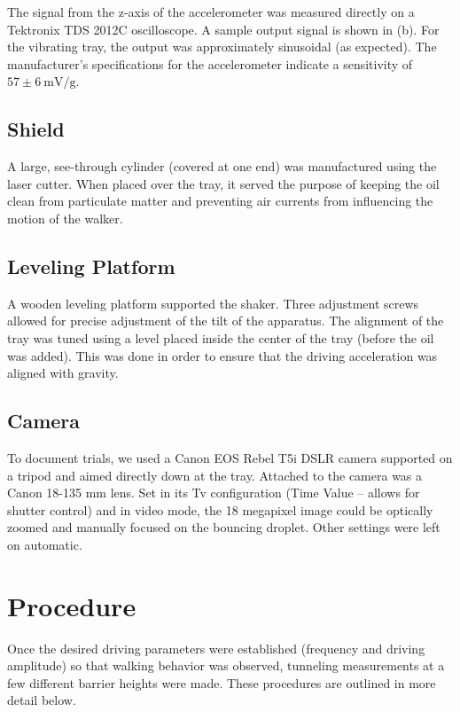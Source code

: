      The signal from the z-axis of the accelerometer was measured directly on a Tektronix TDS 2012C oscilloscope. A sample output signal is shown in (b). For the vibrating tray, the output was approximately sinusoidal (as expected). The manufacturer's specifications for the accelerometer indicate a sensitivity of $57 \pm 6~\mathrm{mV/g}$. 
    
\subsection{Shield}
    A large, see-through cylinder (covered at one end) was manufactured using the laser cutter. When placed over the tray, it served the purpose of keeping the oil clean from particulate matter and preventing air currents from influencing the motion of the walker.       
   
\subsection{Leveling Platform}
    A wooden leveling platform supported the shaker. Three adjustment screws allowed for precise adjustment of the tilt of the apparatus. The alignment of the tray was tuned using a level placed inside the center of the tray (before the oil was added). This was done in order to ensure that the driving acceleration was aligned with gravity.

\subsection{Camera}       
 
To document trials, we used a Canon EOS Rebel T5i DSLR camera supported on a tripod and aimed directly down at the tray. Attached to the camera was a Canon 18-135 mm lens. Set in its Tv configuration (Time Value -- allows for shutter control) and in video mode, the 18 megapixel image could be optically zoomed and manually focused on the bouncing droplet. Other settings were left on automatic.

\section{Procedure}
Once the desired driving parameters were established (frequency and driving amplitude) so that walking behavior was observed, tunneling measurements at a few different barrier heights were made. These procedures are outlined in more detail below.

